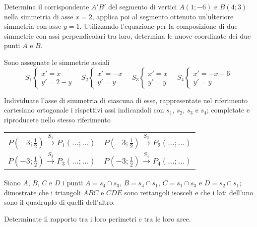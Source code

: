 \begin{esercizio}
  \label{ese:8.99} %
  Determina il corrispondente $A'B'$ del segmento di vertici $A(1;-6)$ 
  e $B(4;3)$ nella simmetria di asse $x = 2$, applica poi al segmento 
  ottenuto un'ulteriore simmetria con asse $y = 1$. Utilizzando 
  l'equazione per la composizione di due simmetrie con assi 
  perpendicolari tra loro, determina le nuove coordinate dei due punti 
  $A$ e $B$.
\end{esercizio}

\begin{esercizio}
  \label{ese:8.101} %
  Sono assegnate le simmetrie assiali
  \[S_1 \begin{cases}x'=x\\y'=2-y\end{cases}\quad  S_2 
  \begin{cases}x'=-x\\y'=y\end{cases}\quad S_3 
  \begin{cases}x'=x\\y'=y\end{cases}\quad S_4 
  \begin{cases}x'=-x-6\\y'=y\end{cases}\]
  \begin{enumeratea}
    \item Individuate l'asse di simmetria di ciascuna di esse, 
    rappresentate nel riferimento cartesiano ortogonale i rispettivi assi 
    indicandoli con $s_1$, $s_2$, $s_3$ e $s_4$; completate e riproducete 
    nello stesso riferimento
    
    \begin{center}
      \begin{tabular}{cc}
        $P\left(-3;\frac{1}{2}\right)\overset{S_1}\longrightarrow 
        P_1(\ldots{};\ldots{})$ & 
        $P\left(-3;\frac{1}{2}\right)\overset{S_2}\longrightarrow 
        P_2(\ldots{};\ldots{})$\\
        $P\left(-3;\frac{1}{2}\right)\overset{S_3}\longrightarrow 
        P_3(\ldots{};\ldots{})$ & 
        $P\left(-3;\frac{1}{2}\right)\overset{S_4}\longrightarrow 
        P_4(\ldots{};\ldots{})$\\
      \end{tabular}
    \end{center}
    
    \item Siano $A$, $B$, $C$ e $D$ i punti $A=s_4\cap s_3$, $B=s_4\cap 
    s_1$, $C=s_1\cap s_3$ e $D=s_2\cap s_1$; dimostrate che i triangoli 
    $ABC$ e $CDE$ sono rettangoli isosceli e che i lati dell'uno sono il 
    quadruplo di quelli dell'altro.
    \item Determinate il rapporto tra i loro perimetri e tra le loro aree.
  \end{enumeratea}
\end{esercizio}

